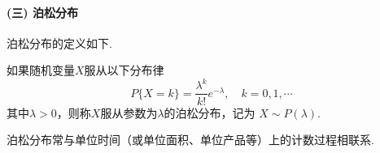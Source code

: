     \paragraph{(三) 泊松分布}
    
            泊松分布的定义如下. 
        \begin{definition}[泊松分布]
            如果随机变量$X$服从以下分布律
            \[ P\{X=k\}=\frac{\lambda^k}{k!}e^{-\lambda},\quad k=0,1,\cdots \]
            其中$\lambda>0$，则称$X$服从参数为$\lambda$的泊松分布，记为
            $X\sim P(\lambda).$
            \end{definition}%
            泊松分布常与单位时间（或单位面积、单位产品等）上的计数过程相联系.